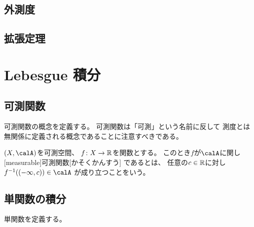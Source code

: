 \documentclass[report]{jlreq}
\begin{document}
%
\section{外測度}


%
\section{拡張定理}






%
\chapter{Lebesgue 積分}

%
\section{可測関数}

可測関数の概念を定義する。
可測関数は「可測」という名前に反して
測度とは無関係に定義される概念であることに注意すべきである。

\begin{definition}[可測関数]
    $(X, \calA)$を可測空間、
    $f \colon X \to \mathbb{R}$を関数とする。
    このとき$f$が$\calA$に関し
    [measurable]{可測関数}[かそくかんすう]
    であるとは、
    任意の$c \in \mathbb{R}$に対し
    $f^{-1}((-\infty, c)) \in \calA$
    が成り立つことをいう。
\end{definition}

%
\section{単関数の積分}

単関数を定義する。
\end{document}
